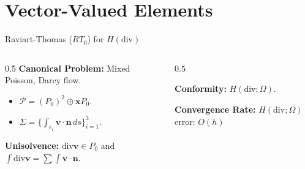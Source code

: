 \documentclass[aspectratio=169]{beamer}
\begin{document}
\section{Vector-Valued Elements}

\begin{frame}{Raviart-Thomas ($RT_0$) for $H(\text{div})$}
    \begin{columns}
        \begin{column}{0.5\textwidth}
            \textbf{Canonical Problem:} Mixed Poisson, Darcy flow.
            \begin{itemize}
                \item $\mathcal{P} = (P_0)^2 \oplus \bm{x} P_0$.
                \item $\Sigma = \{ \int_{e_i} \bm{v} \cdot \bm{n} \, ds \}_{i=1}^3$.
            \end{itemize}
            
            \vspace{0.2cm}
            \textbf{Unisolvence:} $\text{div} \bm{v} \in P_0$ and $\int \text{div} \bm{v} = \sum \int \bm{v} \cdot \bm{n}$.
        \end{column}
        \begin{column}{0.5\textwidth}
            \begin{center}
            \end{center}
            \textbf{Conformity:} $H(\text{div}; \Omega)$.

            \textbf{Convergence Rate:} $H(\text{div};\Omega)$ error: $O(h)$
        \end{column}
    \end{columns}
\end{frame}
\end{document}
